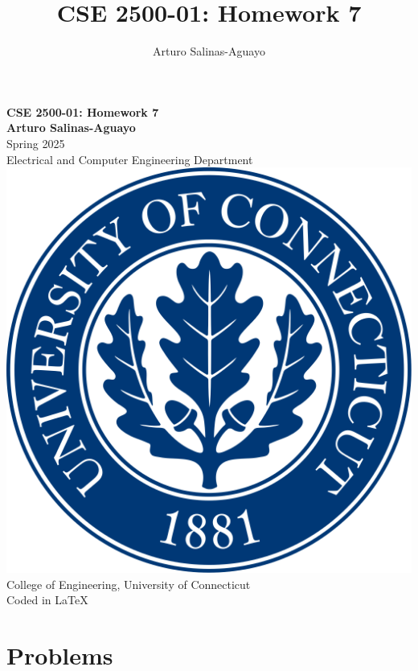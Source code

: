 \documentclass[12pt]{article}
\author{Arturo Salinas-Aguayo}
\title{CSE 2500-01: Homework 7}
\begin{document}
\newcommand{\closure}[2][3]{%
	{}\mkern#1mu\overline{\mkern-#1mu#2}}
\newcommand\ncoverline[1]{\mkern1mu\overline{\mkern-1mu#1\mkern-1mu}\mkern1mu}
\begin{titlepage}
	\centering
	\vspace*{3cm}
	\huge\textbf{CSE 2500-01: Homework 7}\\
	\vspace{5cm}
	\Large\textbf{Arturo Salinas-Aguayo}\\
	\normalsize
	Spring 2025\\
	Electrical and Computer Engineering Department\\
	\vfill
	\includegraphics[scale=0.1]{uconnlogo}\\
	College of Engineering, University of Connecticut\\
	\scriptsize{Coded in \LaTeX}
	\vspace*{1cm}
\end{titlepage}

\section*{Problems}
\end{document}
